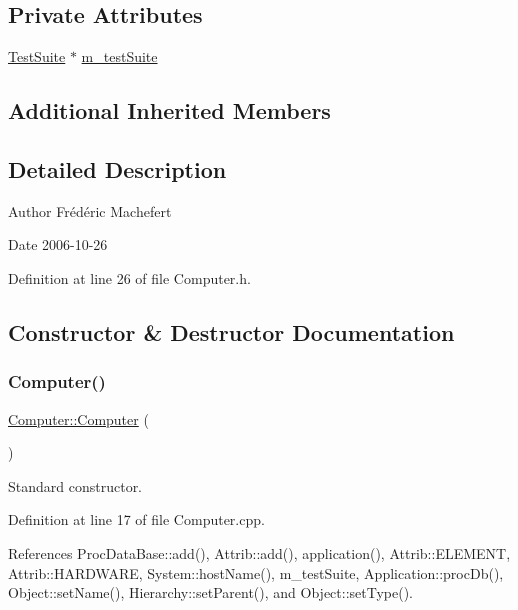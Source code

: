 \subsection*{Private Attributes}
\begin{DoxyCompactItemize}
\item 
\hyperlink{classTestSuite}{Test\+Suite} $\ast$ \hyperlink{classComputer_a5418f176fa9fbd08356ad251f047adcd}{m\+\_\+test\+Suite}
\end{DoxyCompactItemize}
\subsection*{Additional Inherited Members}


\subsection{Detailed Description}
\begin{DoxyAuthor}{Author}
Frédéric Machefert 
\end{DoxyAuthor}
\begin{DoxyDate}{Date}
2006-\/10-\/26 
\end{DoxyDate}


Definition at line 26 of file Computer.\+h.



\subsection{Constructor \& Destructor Documentation}
\mbox{\label{classComputer_a52056dfe9041f024ac58c1eaf02945d3}} 
\subsubsection{\texorpdfstring{Computer()}{Computer()}}
{\footnotesize\ttfamily \hyperlink{classComputer_1_1Computer}{Computer\+::\+Computer} (\begin{DoxyParamCaption}{ }\end{DoxyParamCaption})}



Standard constructor. 



Definition at line 17 of file Computer.\+cpp.



References Proc\+Data\+Base\+::add(), Attrib\+::add(), application(), Attrib\+::\+E\+L\+E\+M\+E\+NT, Attrib\+::\+H\+A\+R\+D\+W\+A\+RE, System\+::host\+Name(), m\+\_\+test\+Suite, Application\+::proc\+Db(), Object\+::set\+Name(), Hierarchy\+::set\+Parent(), and Object\+::set\+Type().


